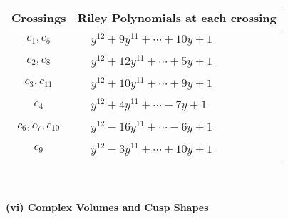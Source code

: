 \documentclass[1p]{elsarticle_modified}
\theoremstyle{definition}
\begin{document}
\begin{tabular}{m{50pt}|m{274pt}}
Crossings & \hspace{64pt}Riley Polynomials at each crossing \\
\hline $$\begin{aligned}c_{1},c_{5}\end{aligned}$$&$\begin{aligned}
&y^{12}+9 y^{11}+\cdots+10 y+1
\end{aligned}$\\
\hline $$\begin{aligned}c_{2},c_{8}\end{aligned}$$&$\begin{aligned}
&y^{12}+12 y^{11}+\cdots+5 y+1
\end{aligned}$\\
\hline $$\begin{aligned}c_{3},c_{11}\end{aligned}$$&$\begin{aligned}
&y^{12}+10 y^{11}+\cdots+9 y+1
\end{aligned}$\\
\hline $$\begin{aligned}c_{4}\end{aligned}$$&$\begin{aligned}
&y^{12}+4 y^{11}+\cdots-7 y+1
\end{aligned}$\\
\hline $$\begin{aligned}c_{6},c_{7},c_{10}\end{aligned}$$&$\begin{aligned}
&y^{12}-16 y^{11}+\cdots-6 y+1
\end{aligned}$\\
\hline $$\begin{aligned}c_{9}\end{aligned}$$&$\begin{aligned}
&y^{12}-3 y^{11}+\cdots+10 y+1
\end{aligned}$\\
\hline
\end{tabular}\\~\\
\newpage\flushleft \textbf{(vi) Complex Volumes and Cusp Shapes}
\end{document}
